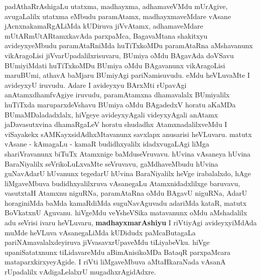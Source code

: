 \begin{artha}
padAthaRrAshigaLu utatxma, madhayxma, adhamaveVMdu mUrAgive,
avugaLalilx utatxma eMbudu paramAtamx, madhayxmaveMdare vAsane
jAcnxnakamaRgALiMda kUDiruva jiVvAtamx, adhamaveMdare
mUtARmUtARtamxkavAda parxpaMca, BagavaMtana shakitxyu avideyxyeMbudu
paramAtaRniMda huTiTxkoMDu paramAtaRna aMshavanunx vikAragoLisi
jiVvarUpadalilxrisuvaru, BUmiya oMdu BAgavAda doVSavu BUmiyiMdati
huTiTxkoMDu BUmiya oMdu BAgavanunx vikAragoLisi maruBUmi, athavA
baMjaru BUmiyAgi pariNamisuvudu. eMdu heVLuvaMte I avideyxyU
iruvudu. Adare I avideyxyu BArxMti rUpavAgi anAtamxdhamfvAgiye
iruvudu, paramAtamxna dhamavalalx BUmiyalilx huTiTxda maruparxdeVshavu
BUmiya oMdu BAgadedxV horatu aKaMDa BUmaMDaladadxlalx, hiVgeye
avideyxyAgali videyxyAgali anAtamx jaDavasutxvina dhamaRgaLeV horatu
shudadhx AtamxnadalilxveMdu I viSayakekx sAMKayxsidAdhxMtavanunx
savxlapx anusarisi heVLuvaru. matutx vAsane - kAmagaLu - kamaR
budidhxyalilx idadxvugaLAgi liMga shariVravanunx biTuTx Atamxnige
baMduseVruvavu. hUvina vAsaneya hUvina BaraNiyalilx seVrikoLuLxvaMte
seVruvavu, gaMdhaveMbudu hUvina guNavAdarU hUvanunx tegedarU hUvina
BaraNiyalilx heVge irabalalxdo, hAge liMgaveMbuva budidhxyalilxruva
vAsanegaLu Atamxnidadxlilxge baruvavu, vasutxtaH Atamxnu niguRNa,
paramAtaRna oMdu BAgavU niguRNa, AdarU horaginiMda baMda kamaRdiMda
suguNavAguvadu adariMda kataR, matutx BoVkatxnU Aguvanu. hiVgeMdu
veYsheVSika matavanunx oMdu aMshadalilx adu seVrisi ivaru heVLuvaru,
\textbf{madhayxmarAshiyu} I riVtiyAgi avideyxyiMdAda muMde heVLuva
vAsanegaLiMda kUDidudx paMcaButagaLa pariNAmavalalxdeyiruva
jiVvasavxrUpaveMdu tiLiyabeVku. hiVge upaniSatatxnunx tiLidavareMdu
aBimAnisikoMDa BataqR parxpaMcara mataparxkirxyeyAgide. I riVti
liMgaveMbuva aMtaHkaraNada vAsanA rUpadalilx vAdigaLelalxrU mugadhxrAgidAdxre.
\end{artha}

\begin{center}


\end{center}

